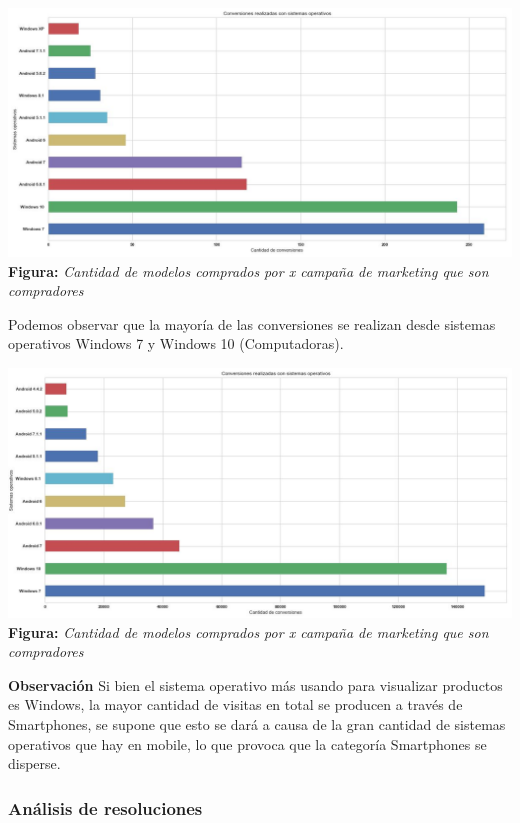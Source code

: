 \documentclass[titlepage,a4paper]{article}
\begin{document}
	  \begin{center}
	\includegraphics[width=16cm]{conversionesRealizadasPorSistemaOperativo.jpg}\\
	\textbf{Figura:}  \textit{Cantidad de modelos comprados por \textit{x} campaña de marketing que son compradores}
	\end{center}
	
	
	Podemos observar que la mayoría de las conversiones se realizan desde sistemas operativos Windows 7 y Windows 10 (Computadoras).
	
	\begin{center}
	\includegraphics[width=16cm]{visitasRealizadasPorSistemaOperativo.jpg}\\
	\textbf{Figura:}  \textit{Cantidad de modelos comprados por \textit{x} campaña de marketing que son compradores}
	\end{center}
	
	\textbf{Observación} Si bien el sistema operativo más usando para visualizar productos es Windows, la mayor cantidad de visitas en total se producen a través de Smartphones, se supone que esto se dará a causa de la gran cantidad de sistemas operativos que hay en mobile, lo que provoca que la categoría Smartphones se disperse.
	
	\subsubsection{Análisis de resoluciones}
\end{document}
